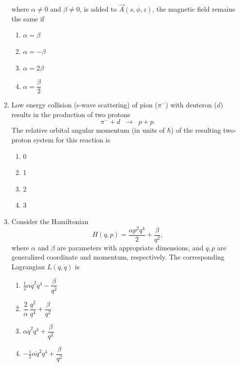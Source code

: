 \documentclass[journal,12pt,onecolumn]{IEEEtran}
\begin{document}
\begin{enumerate}[itemsep=0.45cm]
    where $\alpha \neq 0$ and $\beta \neq 0$, is added to $\vec{A}(s,\phi,z)$, the magnetic field remains the same if

    \hfill{}

    \begin{multicols}{4}
    \begin{enumerate}
        \item $\alpha = \beta$
        \item $\alpha = -\beta$
        \item $\alpha = 2\beta$
        \item $\alpha = \dfrac{\beta}{2}$
    \end{enumerate}
    \end{multicols}


\item Low energy collision (s-wave scattering) of pion ($\pi^{-}$) with deuteron ($d$) results in the production of two protons 
    \[
    \pi^{-} + d \;\;\rightarrow\;\; p + p.
    \]
    The relative orbital angular momentum (in units of $\hbar$) of the resulting two-proton system for this reaction is

    \hfill{}
    
    \begin{multicols}{4}
    \begin{enumerate}
        \item 0
        \item 1
        \item 2
        \item 3
    \end{enumerate}
    \end{multicols}

    \item Consider the Hamiltonian 
    \[
    H(q,p) = \frac{\alpha p^{2} q^{4}}{2} + \frac{\beta}{q^{2}},
    \]
    where $\alpha$ and $\beta$ are parameters with appropriate dimensions, and $q, p$ are generalized coordinate and momentum, respectively. The corresponding Lagrangian $L(q,\dot{q})$ is

    \hfill{}
    
    \begin{multicols}{4}
    \begin{enumerate}
        \item $\tfrac{1}{2}\alpha \dot{q}^{2} q^{4} - \dfrac{\beta}{q^{2}}$
        \item $\dfrac{2}{\alpha}\,\dfrac{q^{2}}{q^{4}} + \dfrac{\beta}{q^{2}}$
        \item $\alpha \dot{q}^{2} q^{4} + \dfrac{\beta}{q^{2}}$
        \item $-\tfrac{1}{2}\alpha \dot{q}^{2} q^{4} + \dfrac{\beta}{q^{2}}$
    \end{enumerate}
    \end{multicols}


\end{enumerate}
\end{document}
